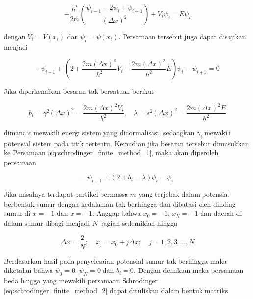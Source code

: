\begin{equation*}
	-\frac{\hbar^2}{2m} \left( \frac{\psi_{i-1} - 2\psi_i + \psi_{i+1}}{(\Delta x)^2} \right) + V_i \psi_i = E \psi_i
\end{equation*}

\noindent
dengan \( V_i = V(x_i) \) dan \( \psi_i = \psi(x_i) \). Persamaan tersebut juga dapat disajikan menjadi

\begin{equation} \label{eq:schrodinger_finite_method_1}
	-\psi_{i-1} + \left(2 + \frac{2m(\Delta x)^2}{\hbar^2} V_i - \frac{2m(\Delta x)^2}{\hbar^2} E\right) \psi_i - \psi_{i+1} = 0
\end{equation}

\noindent
Jika diperkenalkan besaran tak bersatuan berikut

\begin{equation} \label{eq:unitless_schrodinger_finite}
	b_i = \gamma^2 (\Delta x)^2 = \frac{2m(\Delta x)^2 V_i}{\hbar^2}, \quad \lambda = \epsilon^2 (\Delta x)^2 = \frac{2m(\Delta x)^2 E}{\hbar^2}
\end{equation}

\noindent
dimana $\epsilon$ mewakili energi sistem yang dinormalisasi, sedangkan $\gamma_i$ mewakili potensial sistem pada titik tertentu. Kemudian jika besaran tersebut dimasukkan ke Persamaan \ref{eq:schrodinger_finite_method_1}, maka akan diperoleh persamaan

\begin{equation}\label{eq:schrodinger_finite_method_2}
	-\psi_{i-1} + (2 + b_i - \lambda) \psi_i - \psi_{i}
\end{equation}

Jika misalnya terdapat partikel bermassa \( m \) yang terjebak dalam potensial berbentuk sumur dengan kedalaman tak berhingga dan dibatasi oleh dinding sumur di \( x = -1 \) dan \( x = +1 \). Anggap bahwa \( x_0 = -1 \), \( x_N = +1 \) dan daerah di dalam sumur dibagi menjadi \( N \) bagian sedemikian hingga

\[
	\Delta x = \frac{2}{N}; \quad x_j = x_0 + j\Delta x; \quad j = 1, 2, 3, \ldots, N
\]

\noindent
Berdasarkan hasil pada penyelesaian potensial sumur tak berhingga maka diketahui bahwa \( \psi_0 = 0 \), \( \psi_N = 0 \) dan \( b_i = 0 \). Dengan demikian maka persamaan beda hingga yang mewakili persamaan Schrodinger \ref{eq:schrodinger_finite_method_2} dapat dituliskan dalam bentuk matriks

